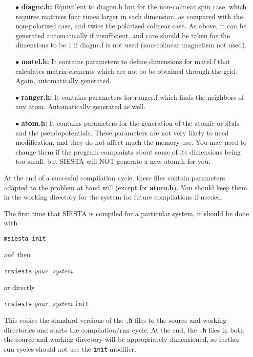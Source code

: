 \begin{itemize}
\item[$\bullet$]
{\bf diagnc.h:}
Equivalent to diagon.h but for the non-colinear spin
case, which requires matrices four times larger in each dimension, 
as compared with the non-polarized case, and twice the polarized colinear
case. As above, it can be generated automatically if insufficient, 
and care should be taken for the dimensions to be 1 if diagnc.f is
not used (non-colinear magnetism not used).

\item[$\bullet$]
{\bf matel.h:}
It contains parameters to define dimensions for
matel.f that calculates matrix elements which are not to be obtained
through the grid. Again, automatically generated.

\item[$\bullet$]
{\bf ranger.h:}
It contains parameters for ranger.f which finds the
neighbors of any atom. Automatically generated as well.

\item[$\bullet$] 
{\bf atom.h:}
It contains parameters for the generation of the atomic
orbitals and the pseudopotentials. These parameters are not very likely
to need modification, and they do not affect much the memory use.
You may need to change them if the program complaints about some
of its dimensions being too small, but SIESTA will NOT generate
a new atom.h for you.

\end{itemize}

At the end of a succesful compilation cycle, these files contain
parameters adapted to the problem at hand will (except for {\bf
atom.h}).  You should keep them in the working
directory for the system for future compilations if needed.

The first time that SIESTA is compiled for a particular
system, it should be done with

{\tt msiesta init} 

\noindent
and then

{\tt rrsiesta} {\it your\_system}

\noindent
or directly 

{\tt rrsiesta} {\it your\_system} {\tt init} .

\noindent
This copies the standard versions of the {\tt *.h} files to the source
and working directories and starts the compilation/run cycle. At the
end, the {\tt *.h} files in both the source and working directory will
be appropriately dimensioned, so further run cycles should not use 
the {\tt init} modifier.

